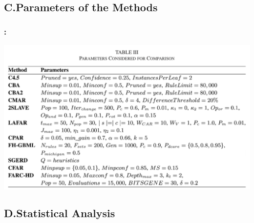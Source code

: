 \documentclass{beamer}
\begin{document}
\begin{CJK*}{UTF8}{bsmi}

\subsection{C.Parameters of the Methods}

\begin{frame}
	\frametitle{\insertsection : \insertsubsection}
	
	\begin{center}
		\includegraphics[height=.7\textheight]{./10.png}
	\end{center}
\end{frame}

\subsection{D.Statistical Analysis}



\end{CJK*}
\end{document}
